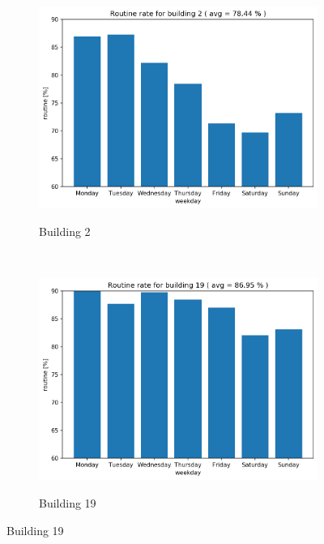 \begin{figure}[H]
	\begin{subfigure}{.5\textwidth}
		\caption{Building 2}
		\includegraphics[width=1\linewidth]{../Figures/EC/b2week.png}
		\label{fig:ec_b2week}
	\end{subfigure}%
	~ 
	\begin{subfigure}{.5\textwidth}
		\caption{Building 19}
		\includegraphics[width=1\linewidth]{../Figures/EC/b19week.png}
		\label{fig:ec_b5week}
	\end{subfigure}%
    \bigskip


\end{figure}
